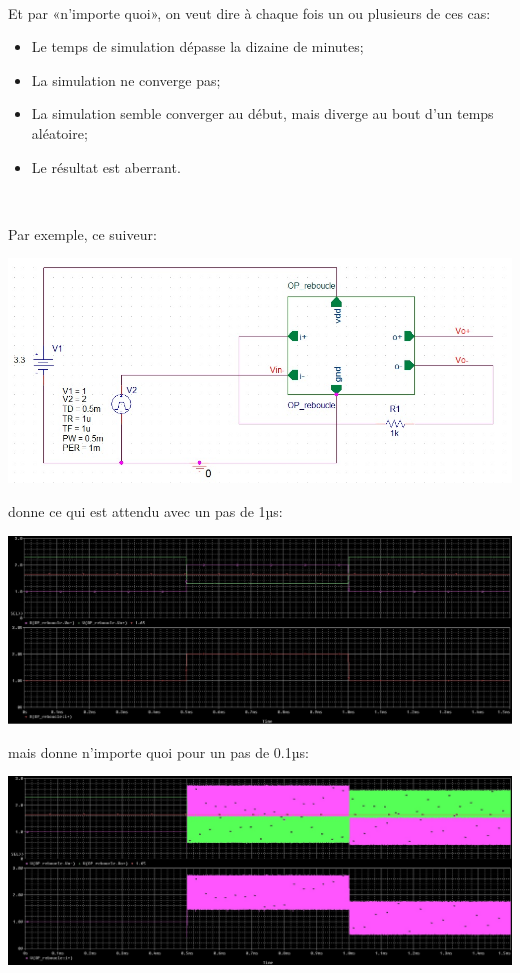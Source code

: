 \documentclass{article}
\begin{document}
~

Et par «n’importe quoi», on veut dire à chaque fois un ou plusieurs de ces cas:

\begin{itemize}
    \item Le temps de simulation dépasse la dizaine de minutes;
    \item La simulation ne converge pas;
    \item La simulation semble converger au début, mais diverge au bout d’un temps aléatoire;
    \item Le résultat est aberrant.
\end{itemize}

~

Par exemple, ce suiveur:

\includegraphics[width=\linewidth/2]{suiveur_schema.png}

donne ce qui est attendu avec un pas de 1µs:



    \includegraphics[width=\linewidth-3cm]{suiveur_qui_marche.png}

mais donne n’importe quoi pour un pas de 0.1µs:

    \includegraphics[width=\linewidth-3cm]{suiveur_qui_plante.png}

\end{document}
